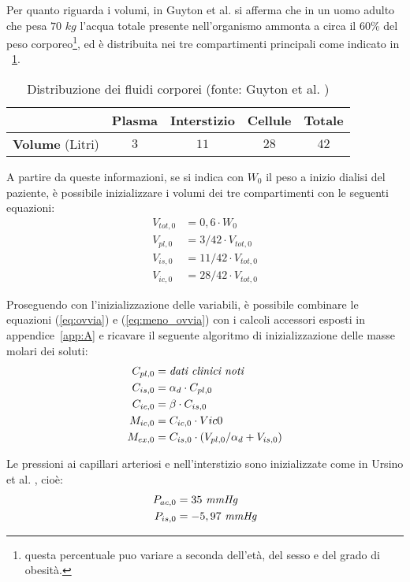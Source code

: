 Per quanto riguarda i volumi, in Guyton et al. \cite{guyton} si afferma che in un uomo adulto che pesa $70$ $kg$ l'acqua totale presente nell'organismo ammonta a circa il 60\% del peso corporeo\footnote{questa percentuale puo variare a seconda dell'età, del sesso e del grado di obesità.}, ed è distribuita nei tre compartimenti principali come indicato in \tablename~\ref{tab:volumi_guyton}.
\begin{table}[htb]
	\centering
	\caption{Distribuzione dei fluidi corporei (fonte: Guyton et al. \cite{guyton})}
	\begin{tabular}{lcccc}
	\toprule 
		                           & \textbf{Plasma}  & \textbf{Interstizio} & \textbf{Cellule} & \textbf{Totale} \\
  \midrule
  	\textbf{Volume} (Litri)        &  $3$                 &  $11$                  &  $28$                   & $42$            \\
   \bottomrule
\end{tabular}\label{tab:volumi_guyton}
\end{table}
A partire da queste informazioni, se si indica con $W_0$ il peso a inizio dialisi del paziente, è possibile inizializzare i volumi dei tre compartimenti con le seguenti equazioni:
\begin{align*}
		V_{tot,0}      &= 0,6\cdot W_0          \\
		V_{pl,0}       &= 3/42  \cdot V_{tot,0} \\
		V_{is,0}       &= 11/42 \cdot V_{tot,0} \\
		V_{ic,0}       &= 28/42 \cdot V_{tot,0} 
\end{align*}

Proseguendo con l'inizializzazione delle variabili, è possibile combinare le equazioni (\ref{eq:ovvia}) e (\ref{eq:meno_ovvia}) con i calcoli accessori esposti in appendice~\ref{app:A} e ricavare il seguente algoritmo di inizializzazione delle masse molari dei soluti:
\begin{align*}
		C_{pl,0} &= \text{\emph{dati clinici noti}} \\
		C_{is,0} &= \alpha_d \cdot C_{pl,0}  \\
    C_{ic,0} &= \beta \cdot C_{is,0}     \\
    M_{ic,0} &= C_{ic,0} \cdot Vic0      \\
    M_{ex,0} &= C_{is,0} \cdot (V_{pl,0}/\alpha_d+ V_{is,0})
\end{align*}

Le pressioni ai capillari arteriosi e nell'interstizio sono inizializzate come in Ursino et al. \cite{ursino}, cioè:
\begin{align*}
		P_{ac,0} &= 35 \text{ \emph{mmHg}} \\
		P_{is,0} &= -5,97 \text{ \emph{mmHg}}
\end{align*}